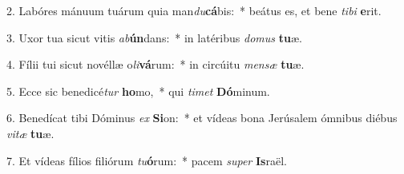 2. Labóres mánuum tuárum quia man\textit{du}\textbf{cá}bis:~*  beátus es, et bene \textit{ti}\textit{bi} \textbf{e}rit.\

3. Uxor tua sicut vitis \textit{ab}\textbf{ún}dans:~*  in latéribus \textit{do}\textit{mus} \textbf{tu}æ.\

4. Fílii tui sicut novéllæ o\textit{li}\textbf{vá}rum:~*  in circúitu \textit{men}\textit{sæ} \textbf{tu}æ.\

5. Ecce sic benedicé\textit{tur} \textbf{ho}mo,~*  qui \textit{ti}\textit{met} \textbf{Dó}minum.\

6. Benedícat tibi Dóminus \textit{ex} \textbf{Si}on:~*  et vídeas bona Jerúsalem ómnibus diébus \textit{vi}\textit{tæ} \textbf{tu}æ.\

7. Et vídeas fílios filiórum \textit{tu}\textbf{ó}rum:~*  pacem \textit{su}\textit{per} \textbf{Is}raël.\

